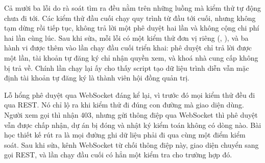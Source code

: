 Cả mười ba lỗi do rà soát tìm ra đều nằm trên những luồng mà kiểm thử tự động chưa đi tới. Các kiểm thử đầu cuối chạy quy trình từ đầu tới cuối, nhưng không tạm dừng rồi tiếp tục, không trả lời một phê duyệt hai lần và không cộng chi phí hai lần cùng lúc. Sau khi sửa, mỗi lỗi có một kiểm thử đơn vị riêng (, ), và ba hành vi được thêm vào lần chạy đầu cuối triển khai: phê duyệt chỉ trả lời được một lần, tài khoản tự đăng ký chỉ nhận quyền xem, và khoá nhà cung cấp không bị trả về. Chính lần chạy lại ấy cho thấy script tạo dữ liệu trình diễn vẫn mặc định tài khoản tự đăng ký là thành viên hội đồng quản trị.

Lỗ hổng phê duyệt qua WebSocket đáng kể lại, vì trước đó mọi kiểm thử đều đi qua REST. Nó chỉ lộ ra khi kiểm thử đi đúng con đường mà giao diện dùng. Người xem gọi  thì nhận 403, nhưng gửi thông điệp  qua WebSocket thì phê duyệt vẫn được chấp nhận, dự án bị đóng và nhật ký kiểm toán không có dòng nào. Bài học thiết kế rút ra là mọi đường ghi dữ liệu phải đi qua cùng một điểm kiểm soát. Sau khi sửa, kênh WebSocket từ chối thông điệp này, giao diện chuyển sang gọi REST, và lần chạy đầu cuối có hẳn một kiểm tra cho trường hợp đó.
